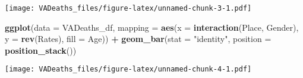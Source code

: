 \documentclass[
]{article}
\newenvironment{Shaded}{\begin{snugshade}}{\end{snugshade}}
\newcommand{\DataTypeTok}[1]{\textcolor[rgb]{0.13,0.29,0.53}{#1}}
\newcommand{\KeywordTok}[1]{\textcolor[rgb]{0.13,0.29,0.53}{\textbf{#1}}}
\newcommand{\NormalTok}[1]{#1}
\newcommand{\OperatorTok}[1]{\textcolor[rgb]{0.81,0.36,0.00}{\textbf{#1}}}
\newcommand{\StringTok}[1]{\textcolor[rgb]{0.31,0.60,0.02}{#1}}
\begin{document}
\texttt{[image: VADeaths\_files/figure-latex/unnamed-chunk-3-1.pdf]}

\begin{Shaded}
\begin{Highlighting}[]
\KeywordTok{ggplot}\NormalTok{(}\DataTypeTok{data =}\NormalTok{ VADeaths_df,}
              \DataTypeTok{mapping =} \KeywordTok{aes}\NormalTok{(}\DataTypeTok{x =} \KeywordTok{interaction}\NormalTok{(Place, Gender), }
                            \DataTypeTok{y =} \KeywordTok{rev}\NormalTok{(Rates), }
                            \DataTypeTok{fill =}\NormalTok{ Age)) }\OperatorTok{+}
\KeywordTok{geom_bar}\NormalTok{(}\DataTypeTok{stat =} \StringTok{"identity"}\NormalTok{, }
         \DataTypeTok{position =} \KeywordTok{position_stack}\NormalTok{())}
\end{Highlighting}
\end{Shaded}

\texttt{[image: VADeaths\_files/figure-latex/unnamed-chunk-4-1.pdf]}
\end{document}
